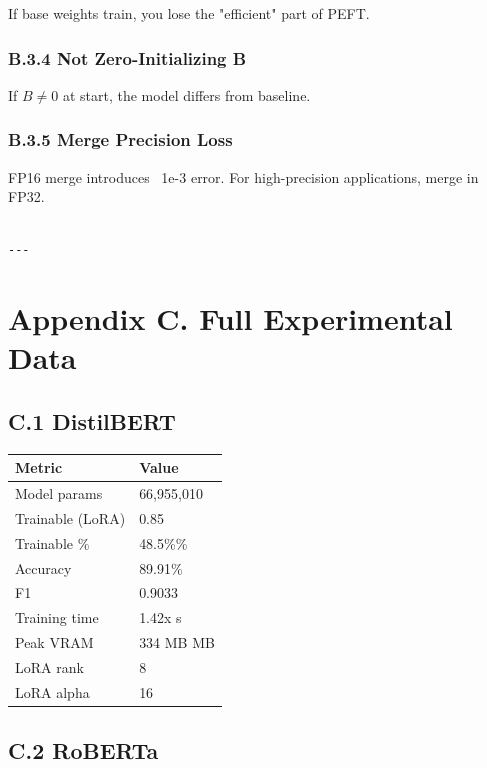 If base weights train, you lose the "efficient" part of PEFT.

\subsubsection{B.3.4 Not Zero-Initializing B}

If $B \neq 0$ at start, the model differs from baseline.

\subsubsection{B.3.5 Merge Precision Loss}

FP16 merge introduces ~1e-3 error. For high-precision applications, merge 
in FP32.
\begin{lstlisting}

---
\end{lstlisting}

\section{Appendix C. Full Experimental Data}

\subsection{C.1 DistilBERT}

\begin{table}[H]
\centering
\small
\begin{tabular}{ll}
\toprule
\textbf{Metric} & \textbf{Value} \\
\midrule
Model params & 66,955,010 \\
Trainable (LoRA) & 0.85 \\
Trainable \% & 48.5\%\% \\
Accuracy & 89.91\% \\
F1 & 0.9033 \\
Training time & 1.42x s \\
Peak VRAM & 334 MB MB \\
LoRA rank & 8 \\
LoRA alpha & 16 \\
\bottomrule
\end{tabular}
\end{table}

\subsection{C.2 RoBERTa}

